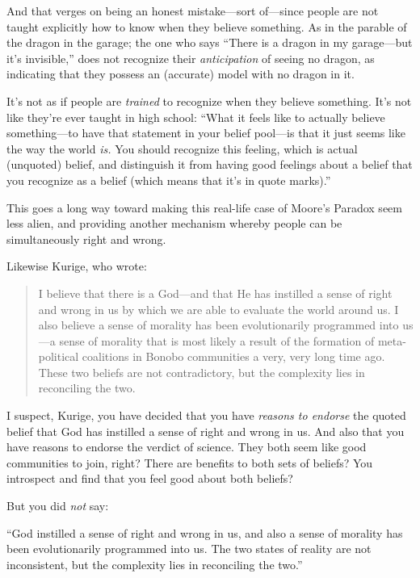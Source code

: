 {
 And that verges on being an honest mistake---sort of---since
people are not taught explicitly how to know when they believe
something. As in the parable of the dragon in the garage; the one who
says ``There is a dragon in my garage---but
it's invisible,'' does not recognize
their \textit{anticipation} of seeing no dragon, as indicating that
they possess an (accurate) model with no dragon in it.}

{
 It's not as if people are \textit{trained} to
recognize when they believe something. It's not like
they're ever taught in high school:
``What it feels like to actually believe
something---to have that statement in your belief pool---is that it
just seems like the way the world \textit{is.} You should recognize
this feeling, which is actual (unquoted) belief, and distinguish it
from having good feelings about a belief that you recognize as a belief
(which means that it's in quote
marks).''}

{
 This goes a long way toward making this real-life case of
Moore's Paradox seem less alien, and providing another
mechanism whereby people can be simultaneously right and wrong.}

{
 Likewise Kurige, who wrote:}

\begin{quote}
{
 I believe that there is a God---and that He has instilled a sense
of right and wrong in us by which we are able to evaluate the world
around us. I also believe a sense of morality has been evolutionarily
programmed into us---a sense of morality that is most likely a result
of the formation of meta-political coalitions in Bonobo communities a
very, very long time ago. These two beliefs are not contradictory, but
the complexity lies in reconciling the two.}
\end{quote}

{
 I suspect, Kurige, you have decided that you have \textit{reasons
to endorse} the quoted belief that God has instilled a sense of right
and wrong in us. And also that you have reasons to endorse the verdict
of science. They both seem like good communities to join, right? There
are benefits to both sets of beliefs? You introspect and find that you
feel good about both beliefs?}

{
 But you did \textit{not} say:}

{
 ``God instilled a sense of right and wrong in us,
and also a sense of morality has been evolutionarily programmed into
us. The two states of reality are not inconsistent, but the complexity
lies in reconciling the two.''}

